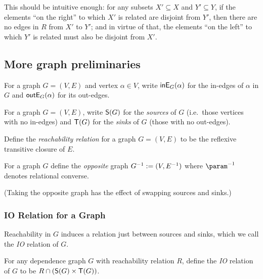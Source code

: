 This should be intuitive enough: for any subsets $X' \subseteq X$ and $Y' \subseteq Y$, if the elements ``on
the right'' to which $X'$ is related are disjoint from $Y'$, then there are no edges in $R$ from $X'$ to $Y'$;
and in virtue of that, the elements ``on the left'' to which $Y'$ is related must also be disjoint from $X'$.

\subsection{More graph preliminaries}


\begin{definition}
For a graph $G=(V,E)$ and vertex $\alpha \in V$, write $\textup{\textsf{inE}}_{G}(\alpha)$ for the in-edges of $\alpha$ in $G$
and $\textup{\textsf{outE}}_{G}(\alpha)$ for its out-edges.
\end{definition}

\begin{definition}
For a graph $G = (V,E)$, write $\mathsf{S}(G)$ for the \emph{sources} of $G$ (i.e.~those vertices with no
in-edges) and $\mathsf{T}(G)$ for the \emph{sinks} of $G$ (those with no out-edges).
\end{definition}

\begin{definition}
Define the \emph{reachability relation} for a graph $G=(V,E)$ to be the reflexive transitive closure of $E$.
\end{definition}

\begin{definition}
For a graph $G$ define the \emph{opposite} graph $G^{-1} := (V,E^{-1})$ where $\param^{-1}$ denotes
relational converse.
\end{definition}

\noindent (Taking the opposite graph has the effect of swapping sources and sinks.)

\subsubsection{IO Relation for a Graph}

Reachability in $G$ induces a relation just between sources and sinks, which we call the \emph{IO} relation of
$G$.

\begin{definition}[IO relation]
For any dependence graph $G$ with reachability relation $R$, define the \emph{IO} relation of $G$ to be $R
\cap (\mathsf{S}(G) \times \mathsf{T}(G))$.
\end{definition}

